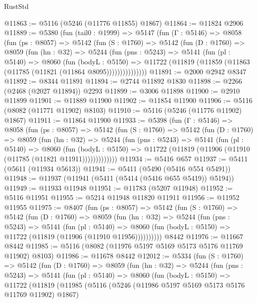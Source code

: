 \begin{lexlean}{RustStd}
\begin{coremodule}
{\begin{coremodule}
{{{{{{{{{{{{{{{{{{{{{{{{{{{{{{{@11863 := @5116 (@5246 (@11776 @11855) @1867)
@11864 := @11824 @2906
@11889 := @5380
    (fun (tail0 : @1999) =>
    @5147
      (fun (Γ : @5146) =>
      @8058
        (fun (ps : @8057) =>
        @5142
          (fun (S : @1760) =>
          @5142
            (fun (D : @1760) =>
            @8059
              (fun (hn : @32) =>
              @5244
                (fun (pns : @5243) =>
                @5141
                  (fun (pl : @5140) =>
                  @8060
                    (fun (bodyL : @5150) =>
                    @11722 (@11819 (@11859 (@11863 (@11785 (@11821 (@11864 @8095)))))))))))))))
@11891 := @2000 @2942 @8347
@11892 := @8344 @11891
@11894 := @2744 @11892 @1830
@11898 := @2266 (@2468 (@2027 @11894)) @2293
@11899 := @3006 @11898
@11900 := @2910 @11899
@11901 := @11889 @11900
@11902 := @11854 @11900
@11906 := @5116 (@8082 (@11771 @11902) @8103)
@11910 := @5116 (@5246 (@11776 @11902) @1867)
@11911 := @11864 @11900
@11933 := @5398
    (fun (Γ : @5146) =>
    @8058
      (fun (ps : @8057) =>
      @5142
        (fun (S : @1760) =>
        @5142
          (fun (D : @1760) =>
          @8059
            (fun (hn : @32) =>
            @5244
              (fun (pns : @5243) =>
              @5141
                (fun (pl : @5140) =>
                @8060
                  (fun (bodyL : @5150) =>
                  @11722 (@11819 (@11906 (@11910 (@11785 (@11821 @11911)))))))))))))
@11934 := @5416 @657
@11937 := @5411 (@5611 (@11934 @5613))
@11941 := @5411 (@5490 (@5416 @554 @5491))
@11948 := @11937 (@11941 (@5411 (@5414 (@5416 @655 @5419)) @5194))
@11949 := @11933 @11948
@11951 := @11783 (@5207 @11948)
@11952 := @5116 @11951
@11955 := @5214 @11948 @11820 @11911
@11956 := @11952 @11955
@11975 := @8407
    (fun (ps : @8057) =>
    @5142
      (fun (S : @1760) =>
      @5142
        (fun (D : @1760) =>
        @8059
          (fun (hn : @32) =>
          @5244
            (fun (pns : @5243) =>
            @5141
              (fun (pl : @5140) =>
              @8060 (fun (bodyL : @5150) => @11722 (@11819 (@11906 (@11910 @11956))))))))))
    @8442
@11976 := @11667 @8442
@11985 := @5116 (@8082 (@11976 @5197 @5169 @5173 @5176 @11769 @11902) @8103)
@11986 := @11678 @8442
@12012 := @5334
    (fun (S : @1760) =>
    @5142
      (fun (D : @1760) =>
      @8059
        (fun (hn : @32) =>
        @5244
          (fun (pns : @5243) =>
          @5141
            (fun (pl : @5140) =>
            @8060
              (fun (bodyL : @5150) =>
              @11722
                (@11819
                  (@11985
                    (@5116
                      (@5246 (@11986 @5197 @5169 @5173 @5176 @11769 @11902) @1867)
}}}}}}}}}}}}}}}}}}}}}}}}}}}}}}}
\end{coremodule}}
\end{coremodule}
\end{lexlean}
